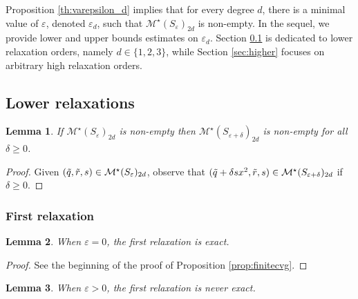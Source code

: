 \documentclass[a4paper,12pt]{article}
\newcommand{\cM}{\mathcal{M}} %
\newtheorem{lemma}{Lemma}
\newcommand{\revise}[1]{{\color{black}#1}}
\begin{document}
{Proposition} \ref{th:varepsilon_d} implies that for every degree $d$, there is a minimal value of $\varepsilon$, denoted $\varepsilon_d$, such that {$\cM^{\star}(S_{\varepsilon})_{2 d}$} is non-empty. 
In the sequel, we provide lower and upper bounds estimates on $\varepsilon_d$. 
Section \ref{sec:lower} is dedicated to lower relaxation orders, namely $d\in\{1,2,3\}$, while Section \ref{sec:higher} focuses on arbitrary high relaxation orders. 



\subsection{Lower relaxations}
\label{sec:lower}

{
\begin{lemma}
\label{lemma:cMstar}
If $\cM^{\star}(S_{\varepsilon})_{2 d}$ is non-empty then
$\cM^{\star}(S_{\varepsilon+\delta})_{2 d}$ is non-empty for all $\delta\geq 0$. 
\end{lemma}

\begin{proof}
Given $(\revise{\tilde{q}, \tilde{r}}, s) \in \cM^{\star}(S_{\varepsilon})_{2 d}$,
observe that $(\revise{\tilde{q}}+\delta s x^2, \revise{\tilde{r}}, s) \in \cM^{\star}(S_{\varepsilon+\delta})_{2 d}$ if $\delta \geq 0$.
\end{proof}
}

\subsubsection{First relaxation}

\begin{lemma}\label{exact1}
When $\varepsilon=0$, the first relaxation is exact.
\end{lemma}
%
\begin{proof}
See the beginning of the proof of {Proposition} \ref{prop:finitecvg}. 
\end{proof}


\begin{lemma}
When $\varepsilon>0$, the first relaxation is never exact.
\end{lemma}
\end{document}
